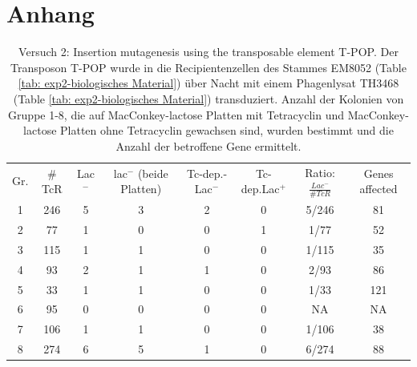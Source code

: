 \documentclass[oneside,10pt,a4paper]{report}
\begin{document}
	\chapter{Anhang}
\begin{table}[H]
	\centering
	\caption{Versuch 2: Insertion mutagenesis using the transposable element T-POP. Der Transposon T-POP wurde in die Recipientenzellen des Stammes EM8052 (Table \ref{tab: exp2-biologisches Material}) über Nacht mit einem Phagenlysat TH3468 (Table \ref{tab: exp2-biologisches Material}) transduziert. Anzahl der Kolonien von Gruppe 1-8, die auf MacConkey-lactose Platten mit Tetracyclin und MacConkey-lactose Platten ohne Tetracyclin gewachsen sind, wurden bestimmt und die Anzahl der betroffene Gene ermittelt.}
	\label{tab: exp2-Rohdaten}
	\begin{tabular}{cccccccc}
		\toprule
		\multirow{2}{*}{Gr.} & \multirow{2}{*}{$\#$TcR} & \multirow{2}{*}{Lac$^-$}&\multirow{2}{*}{lac$^-$ (beide Platten)} & \multirow{2}{*}{Tc-dep.-Lac$^-$}& \multirow{2}{*}{Tc-dep.Lac$^+$}& \multirow{2}{*}{Ratio: $\frac{Lac^-}{\#TcR}$}&\multirow{2}{*}{\parbox[*]{1.2cm}{Genes affected}}\\
		&&&&&&&\\
		\midrule
		1 & 246 & 5 & 3 & 2 & 0 & 5/246 & 81\\
		2 & 77 & 1 & 0 & 0 & 1 & 1/77 & 52\\
		3 & 115 & 1 & 1 & 0 & 0 & 1/115& 35\\
		4 & 93 & 2 & 1 & 1 & 0 & 2/93 & 86\\
		5 & 33 & 1 & 1 & 0 & 0 & 1/33& 121\\
		6 & 95 & 0 & 0 & 0 & 0 & NA & NA\\
		7 & 106 & 1 & 1 & 0 & 0 & 1/106 & 38\\
		8 & 274 & 6 & 5 & 1 & 0 & 6/274 & 88\\
		\bottomrule			
	\end{tabular}
\end{table}
	
	
	
	
	\nocite{*}
	
	\newpage
\end{document}
